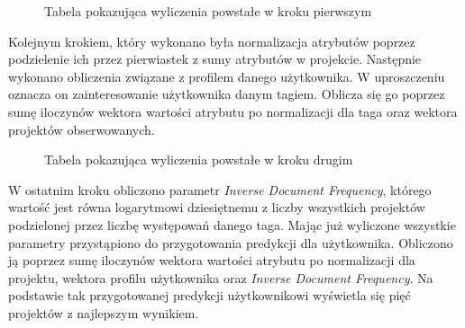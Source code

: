 \begin{figure}[h!]
	\caption{Tabela pokazująca wyliczenia powstałe w kroku pierwszym}
	\centering
\end{figure}

Kolejnym krokiem, który wykonano była normalizacja atrybutów poprzez podzielenie ich przez pierwiastek z sumy atrybutów w projekcie. Następnie wykonano obliczenia związane z profilem danego użytkownika. W uproszczeniu oznacza on zainteresowanie użytkownika danym tagiem. Oblicza się go poprzez sumę iloczynów wektora wartości atrybutu po normalizacji dla taga oraz wektora projektów obserwowanych.

\begin{figure}[h!]
	\caption{Tabela pokazująca wyliczenia powstałe w kroku drugim}
	\centering
\end{figure}

\bigskip
\bigskip

W ostatnim kroku obliczono parametr \textit{Inverse Document Frequency}, którego wartość jest równa logarytmowi dziesiętnemu z liczby wszystkich projektów podzielonej przez liczbę występowań danego taga. Mając już wyliczone wszystkie parametry przystąpiono do przygotowania predykcji dla użytkownika. Obliczono ją poprzez sumę iloczynów wektora wartości atrybutu po normalizacji dla projektu, wektora profilu użytkownika oraz \textit{Inverse Document Frequency}. Na podstawie tak przygotowanej predykcji użytkownikowi wyświetla się pięć projektów z najlepszym wynikiem. 


